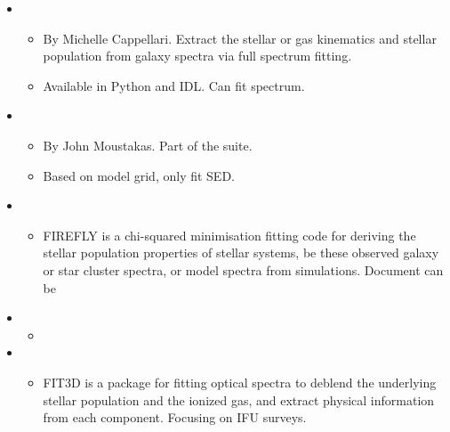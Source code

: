 \documentclass[letterpaper,10pt,english]{sphinxmanual}
\begin{document}
\begin{itemize}
\item {} 
\begin{itemize}
\item {} 
By Michelle Cappellari. Extract the stellar or gas kinematics and
stellar population from galaxy spectra via full spectrum fitting.

\item {} 
Available in Python and IDL. Can fit spectrum.

\end{itemize}

\item {} 
\begin{itemize}
\item {} 
By John Moustakas. Part of the  suite. 

\item {} 
Based on model grid, only fit SED.

\end{itemize}

\item {} 
\begin{itemize}
\item {} 
FIREFLY is a chi-squared minimisation fitting code for deriving
the stellar population properties of stellar systems, be these
observed galaxy or star cluster spectra, or model spectra from
simulations. Document can be 

\end{itemize}

\item {} 
\begin{itemize}
\item {} 

\end{itemize}

\item {} 
\begin{itemize}
\item {} 
FIT3D is a package for fitting optical spectra to deblend the
underlying stellar population and the ionized gas, and extract
physical information from each component. Focusing on IFU surveys.


\end{itemize}
\end{itemize}
\end{document}

